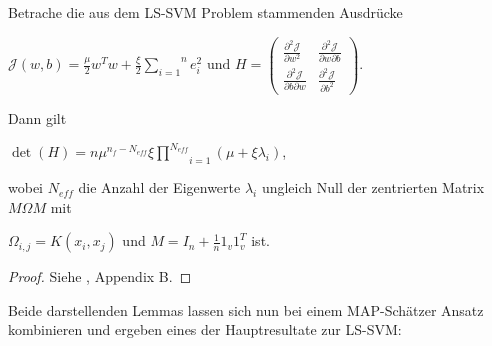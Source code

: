 \begin{lemma}
Betrache die aus dem LS-SVM Problem stammenden Ausdrücke 
\begin{center}
	$\mathcal{J}(w,b) = \frac{\mu}{2}w^T w + \frac{\xi}{2}\overset{n}{\underset{i=1}			{\sum}} e_i ^2 \text{ und } H = \begin{pmatrix}
	\frac{\partial^2 \mathcal{J}}{\partial w^2 } & \frac{\partial^2 \mathcal{J}}				{\partial w \partial b } \\
	\frac{\partial^2 \mathcal{J}}{\partial b \partial w } & \frac{\partial^2 					\mathcal{J}}{\partial b^2 }
	\end{pmatrix}.$
\end{center}

Dann gilt

\begin{center}
	$\det(H) = n \mu^{n_f - N_{eff}} \xi \underset{i=1}{\overset{N_{eff}}{\prod}}(\mu + 			\xi \lambda_i)$,
\end{center}

wobei $N_{eff}$ die Anzahl der Eigenwerte $\lambda_i$ ungleich Null der zentrierten Matrix $M \Omega M$ mit
\begin{center}
	$\Omega_{i,j} = K(x_i, x_j)$ und $M = I_n + \frac{1}{n} 1_v 1_v^T$ ist.
\end{center}
\end{lemma}

\begin{proof}
Siehe \cite{LS-SVM}, Appendix B.
\end{proof}

Beide darstellenden Lemmas lassen sich nun bei einem MAP-Schätzer Ansatz kombinieren und ergeben eines der Hauptresultate zur LS-SVM:


